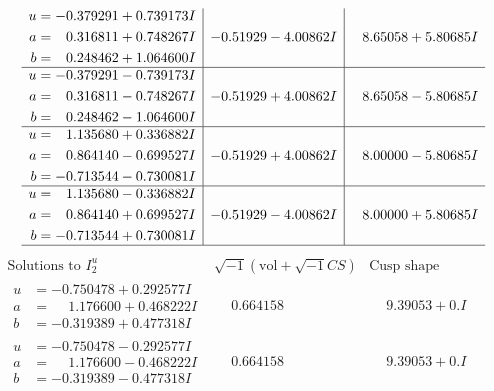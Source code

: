 \documentclass[1p]{elsarticle_modified}
\theoremstyle{definition}
\newcommand{\I}{\sqrt{-1}}
\begin{document}
$$\begin{array}{c|c|c}
\begin{aligned}
u &= -0.379291 + 0.739173 I \\
a &= \phantom{-}0.316811 + 0.748267 I \\
b &= \phantom{-}0.248462 + 1.064600 I\end{aligned}
 & -0.51929 - 4.00862 I & \phantom{-}8.65058 + 5.80685 I \\ \hline\begin{aligned}
u &= -0.379291 - 0.739173 I \\
a &= \phantom{-}0.316811 - 0.748267 I \\
b &= \phantom{-}0.248462 - 1.064600 I\end{aligned}
 & -0.51929 + 4.00862 I & \phantom{-}8.65058 - 5.80685 I \\ \hline\begin{aligned}
u &= \phantom{-}1.135680 + 0.336882 I \\
a &= \phantom{-}0.864140 - 0.699527 I \\
b &= -0.713544 - 0.730081 I\end{aligned}
 & -0.51929 + 4.00862 I & \phantom{-}8.00000 - 5.80685 I \\ \hline\begin{aligned}
u &= \phantom{-}1.135680 - 0.336882 I \\
a &= \phantom{-}0.864140 + 0.699527 I \\
b &= -0.713544 + 0.730081 I\end{aligned}
 & -0.51929 - 4.00862 I & \phantom{-}8.00000 + 5.80685 I\\
 \hline 
 \end{array}$$\newpage$$\begin{array}{c|c|c}  
\text{Solutions to }I^u_{2}& \I (\text{vol} + \sqrt{-1}CS) & \text{Cusp shape}\\
 \hline 
\begin{aligned}
u &= -0.750478 + 0.292577 I \\
a &= \phantom{-}1.176600 + 0.468222 I \\
b &= -0.319389 + 0.477318 I\end{aligned}
 & \phantom{-}0.664158\phantom{ +0.000000I} & \phantom{-}9.39053 + 0. I\phantom{ +0.000000I} \\ \hline\begin{aligned}
u &= -0.750478 - 0.292577 I \\
a &= \phantom{-}1.176600 - 0.468222 I \\
b &= -0.319389 - 0.477318 I\end{aligned}
 & \phantom{-}0.664158\phantom{ +0.000000I} & \phantom{-}9.39053 + 0. I\phantom{ +0.000000I} \\ \hline\begin{aligned}

\end{aligned}
\end{array}$$
\end{document}
